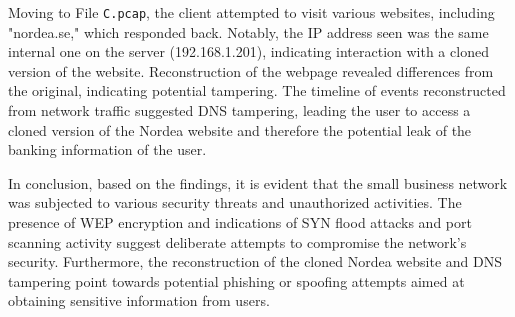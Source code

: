 \noindent Moving to File \texttt{C.pcap}, the client attempted to visit various websites, including "nordea.se," which responded back. Notably, the IP address seen was the same internal one on the server (192.168.1.201), indicating interaction with a cloned version of the website. Reconstruction of the webpage revealed differences from the original, indicating potential tampering. The timeline of events reconstructed from network traffic suggested DNS tampering, leading the user to access a cloned version of the Nordea website and therefore the potential leak of the banking information of the user.
\newline

\noindent In conclusion, based on the findings, it is evident that the small business network was subjected to various security threats and unauthorized activities. The presence of WEP encryption and indications of SYN flood attacks and port scanning activity suggest deliberate attempts to compromise the network's security. Furthermore, the reconstruction of the cloned Nordea website and DNS tampering point towards potential phishing or spoofing attempts aimed at obtaining sensitive information from users.
